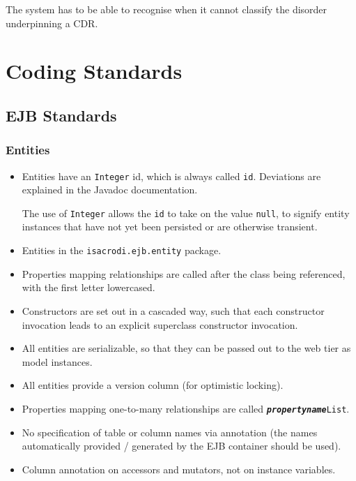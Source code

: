 \documentclass[a4paper,fleqn]{article}
\newcommand{\computercode}[1]{\texttt{#1}}
\newcommand{\computermeta}[1]{\texttt{\textbf{\textit{#1}}}}
\begin{document}
The system has to be able to recognise when it cannot classify the
disorder underpinning a CDR.


\section{Coding Standards}



\subsection{EJB Standards}

\subsubsection{Entities}

\begin{itemize}

\item Entities have an \computercode{Integer} id, which is always
  called \computercode{id}. Deviations are explained in the Javadoc
  documentation.

  The use of \computercode{Integer} allows
  the \computercode{id} to take on the value \computercode{null}, to
  signify entity instances that have not yet been persisted or are
  otherwise transient.

\item Entities in the \computercode{isacrodi.ejb.entity} package.  

\item Properties mapping relationships are called after the class
  being referenced, with the first letter lowercased.

\item Constructors are set out in a cascaded way, such that each
  constructor invocation leads to an explicit superclass constructor
  invocation.

\item All entities are serializable, so that they can be passed out to the
  web tier as model instances.

\item All entities provide a version column (for optimistic locking).

\item Properties mapping one-to-many relationships are called
  \computercode{\computermeta{propertyname}List}.

\item No specification of table or column names via annotation (the
  names automatically provided / generated by the EJB container should
  be used).

\item Column annotation on accessors and mutators, not on instance
  variables.

\end{itemize}
\end{document}
